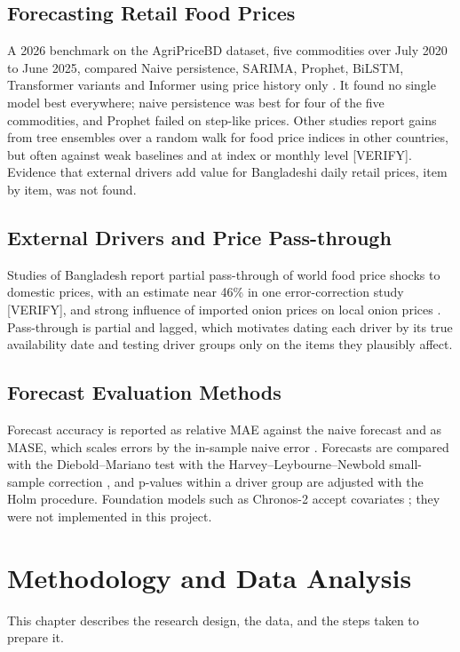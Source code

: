 \documentclass[12pt]{report}
\begin{document}
\section{Forecasting Retail Food Prices}
A 2026 benchmark on the AgriPriceBD dataset, five commodities over July 2020 to June 2025, compared Naive persistence, SARIMA, Prophet, BiLSTM, Transformer variants and Informer using price history only \cite{agripricebd}. It found no single model best everywhere; naive persistence was best for four of the five commodities, and Prophet failed on step-like prices. Other studies report gains from tree ensembles over a random walk for food price indices in other countries, but often against weak baselines and at index or monthly level [VERIFY]. Evidence that external drivers add value for Bangladeshi daily retail prices, item by item, was not found.

\section{External Drivers and Price Pass-through}
Studies of Bangladesh report partial pass-through of world food price shocks to domestic prices, with an estimate near 46\% in one error-correction study [VERIFY], and strong influence of imported onion prices on local onion prices \cite{onionnardl}. Pass-through is partial and lagged, which motivates dating each driver by its true availability date and testing driver groups only on the items they plausibly affect.

\section{Forecast Evaluation Methods}
Forecast accuracy is reported as relative MAE against the naive forecast and as MASE, which scales errors by the in-sample naive error \cite{hk2006}. Forecasts are compared with the Diebold--Mariano test \cite{dm1995} with the Harvey--Leybourne--Newbold small-sample correction \cite{hln1997}, and p-values within a driver group are adjusted with the Holm procedure. Foundation models such as Chronos-2 accept covariates \cite{chronos2}; they were not implemented in this project.

\chapter{Methodology and Data Analysis}
This chapter describes the research design, the data, and the steps taken to prepare it.
\end{document}
